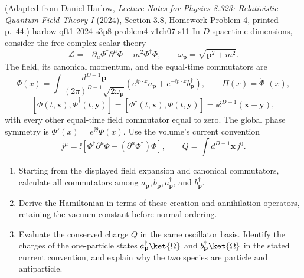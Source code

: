 \begin{enumerate}
  {(Adapted from Daniel Harlow, \emph{Lecture Notes for Physics 8.323: Relativistic Quantum Field Theory I} (2024), Section 3.8, Homework Problem 4, printed p.~44.)}
  {harlow-qft1-2024-s3p8-problem4-v1ch07-s11}
In \(D\) spacetime dimensions, consider the free complex scalar theory
\[
 \mathcal L=-\partial_\mu\Phi^\dagger\partial^\mu\Phi
 -m^2\Phi^\dagger\Phi,
 \qquad \omega_{\mathbf p}=\sqrt{\mathbf p^2+m^2}.
\]
The field, its canonical momentum, and the equal-time commutators are
\[
 \Phi(x)=\int\frac{d^{D-1}\mathbf p}
 {(2\pi)^{D-1}\sqrt{2\omega_{\mathbf p}}}
 \left(e^{\ii p\cdot x}a_{\mathbf p}
 +e^{-\ii p\cdot x}b_{\mathbf p}^\dagger\right),
 \qquad \Pi(x)=\dot\Phi^\dagger(x),
\]
\[
 [\Phi(t,\mathbf x),\dot\Phi^\dagger(t,\mathbf y)]
 =[\Phi^\dagger(t,\mathbf x),\dot\Phi(t,\mathbf y)]
 =\ii\delta^{D-1}(\mathbf x-\mathbf y),
\]
with every other equal-time field commutator equal to zero.  The global
phase symmetry is \(\Phi'(x)=e^{\ii\theta}\Phi(x)\).  Use the volume's
current convention
\[
 j^\mu=\ii\left[
 \Phi^\dagger\partial^\mu\Phi
 -(\partial^\mu\Phi^\dagger)\Phi\right],
 \qquad Q=\int d^{D-1}\mathbf x\,j^0.
\]
\begin{enumerate}
\item
Starting from the displayed field expansion and canonical commutators,
calculate all commutators among
\(a_{\mathbf p},b_{\mathbf p},a_{\mathbf p}^\dagger\), and
\(b_{\mathbf p}^\dagger\).
\item
Derive the Hamiltonian in terms of these creation and annihilation
operators, retaining the vacuum constant before normal ordering.
\item
Evaluate the conserved charge \(Q\) in the same oscillator basis.
Identify the charges of the one-particle states
\(a_{\mathbf p}^\dagger\ket{\Omega}\) and
\(b_{\mathbf p}^\dagger\ket{\Omega}\) in the stated current convention,
and explain why the two species are particle and antiparticle.
\end{enumerate}
\end{enumerate}

